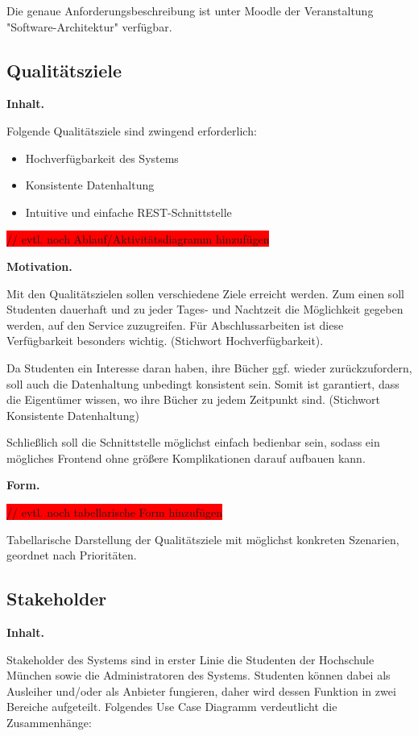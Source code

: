 \documentclass[]{article}
\begin{document}
Die genaue Anforderungsbeschreibung ist unter Moodle der Veranstaltung "Software-Architektur" verfügbar.

\subsection{Qualitätsziele}\label{_qualit_tsziele}

\textbf{Inhalt.}

Folgende Qualitätsziele sind zwingend erforderlich: 

\begin{itemize}
	\item Hochverfügbarkeit des Systems
	\item Konsistente Datenhaltung
	\item Intuitive und einfache REST-Schnittstelle
\end{itemize}

\colorbox{red} {// evtl. noch Ablauf/Aktivitätsdiagramm hinzufügen}

\textbf{Motivation.}

Mit den Qualitätszielen sollen verschiedene Ziele erreicht werden. Zum einen soll Studenten dauerhaft und zu jeder Tages- und Nachtzeit die Möglichkeit gegeben werden, auf den Service zuzugreifen. Für Abschlussarbeiten ist diese Verfügbarkeit besonders wichtig. (Stichwort Hochverfügbarkeit).

Da Studenten ein Interesse daran haben, ihre Bücher ggf. wieder zurückzufordern, soll auch die Datenhaltung unbedingt konsistent sein. Somit ist garantiert, dass die Eigentümer wissen, wo ihre Bücher zu jedem Zeitpunkt sind. (Stichwort Konsistente Datenhaltung)

Schließlich soll die Schnittstelle möglichst einfach bedienbar sein, sodass ein mögliches Frontend ohne größere Komplikationen darauf aufbauen kann.


\textbf{Form.}

\colorbox{red} {// evtl. noch tabellarische Form hinzufügen}

Tabellarische Darstellung der Qualitätsziele mit möglichst konkreten
Szenarien, geordnet nach Prioritäten.

\subsection{Stakeholder}\label{_stakeholder}

\textbf{Inhalt.}

Stakeholder des Systems sind in erster Linie die Studenten der Hochschule München sowie die Administratoren des Systems. Studenten können dabei als Ausleiher und/oder als Anbieter fungieren, daher wird dessen Funktion in zwei Bereiche aufgeteilt. Folgendes Use Case Diagramm verdeutlicht die Zusammenhänge:
\end{document}
